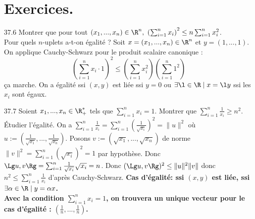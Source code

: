 \documentclass[11pt]{article}
\begin{document}
\pagebreak

\section{Exercices.}

\begin{exercice}{37.6}{}
    Montrer que pour tout $(x_1,...,x_n)\in\R^n,~\left( \sum_{i=1}^nx_i \right)^2\leq n\sum_{i=1}^nx_i^2$.\\
    Pour quels $n$-uplets a-t-on égalité ?
    \tcblower
    Soit $x=(x_1,...,x_n)\in\R^n$ et $y=(1,...,1)$. On applique Cauchy-Schwarz pour le produit scalaire canonique :
    \begin{equation*}
        \left( \sum_{i=1}^nx_i\cdot1 \right)^2 \leq \left(\sum_{i=1}^nx_i^2\right)\left(\sum_{i=1}^n1^2\right)
    \end{equation*}
    ça marche.\n
    On a égalité ssi $(x,y)$ est liée ssi $y=0$ ou $\exists\l\in\R\mid x=\l y$ ssi les $x_i$ sont égaux.
\end{exercice}

\begin{exercice}{37.7}{}
    Soient $x_1,...,x_n\in\R_+^*$ tels que $\sum_{i=1}^nx_i=1$. Montrer que $\sum_{i=1}^n\frac{1}{x_i}\geq n^2$. Étudier l'égalité.
    \tcblower
    On a $\sum_{i=1}^n\frac{1}{x_i}=\sum_{i=1}^n\left( \frac{1}{\sqrt{x_i}} \right)^2=\|u\|^2$ où $u:=(\frac{1}{\sqrt{x_1}},...,\frac{1}{\sqrt{x_n}})$.\n
    Posons $v:=(\sqrt{x_1},...,\sqrt{x_n})$ de norme $\|v\|^2=\sum_{i=1}^n(\sqrt{x_i})^2=1$ par hypothèse.\n
    Donc $\Lg u,v \Rg = \sum_{i=1}^n\frac{1}{\sqrt{x_i}}\sqrt{x_i}=n$.\n
    Donc $(\Lg u,v\Rg)^2\leq\|u\|^2\|v\|$ donc $n^2\leq\sum_{i=1}^n\frac{1}{x_i}$ d'après Cauchy-Schwarz.\n
    \bf{Cas d'égalité:} ssi $(x,y)$ est liée, ssi $\exists \alpha \in \R \mid y = \alpha x$.\\
    Avec la condition $\sum_{i=1}^nx_i=1$, on trouvera un unique vecteur pour le cas d'égalité : $(\frac{1}{n},...,\frac{1}{n})$.
\end{exercice}
\end{document}
